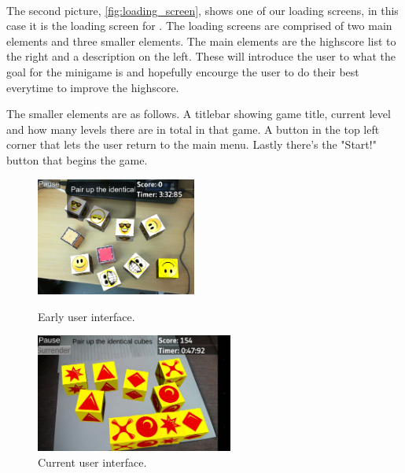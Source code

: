 \paragraph{}
The second picture, \autoref{fig:loading_screen}, shows one of our loading screens, in this case it is the loading screen for .
The loading screens are comprised of two main elements and three smaller elements.
The main elements are the highscore list to the right and a description on the left.
These will introduce the user to what the goal for the minigame is and hopefully encourge the user to do their best everytime to improve the highscore.

The smaller elements are as follows. A titlebar showing game title, current level and how many levels there are in total in that game.
A button in the top left corner that lets the user return to the main menu. Lastly there's the "Start!" button that begins the game.

\begin{figure}[h]
	\centering
	\begin{minipage}{0.48\textwidth}
		\capstart
		\centering
		\includegraphics[height=110pt]{images/match_cubes_old}
		\caption[Previous UI in game.]{Early user interface.}
		\label{fig:early_user_interface}
	\end{minipage}
	\begin{minipage}{0.48\textwidth}
		\capstart
		\centering
		\includegraphics[height=110pt]{images/match_cubes_new}
		\caption[Current UI in game.]{Current user interface.}
		\label{fig:current_user_interface}
	\end{minipage}
\end{figure}


